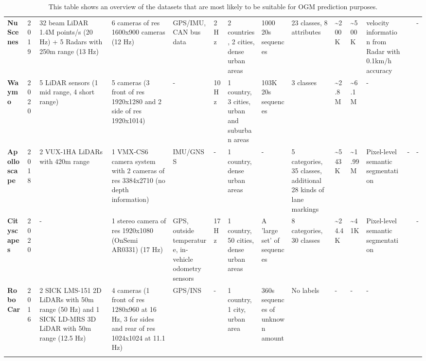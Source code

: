 {\begin{landscape}
\begin{longtable}{m{4em}m{2em}m{7em}m{7em}m{5em}m{2em}m{5em}m{7em}m{4em}m{2em}m{2em}m{5em}m{1em}m{1em}}
			\textbf{NuScenes \cite{caesar2020nuscenes}} & 2019 & 32 beam LiDAR 1.4M points/s (20 Hz) + 5 Radars with 250m range (13 Hz) & 6 cameras of res 1600x900 cameras (12 Hz) & GPS/IMU, CAN bus data & 2 Hz & 2 countries, 2 cities, dense urban areas & 1000 20s sequences & 23 classes, 8 attributes & \textasciitilde{}200K & \textasciitilde{}500K & velocity information from Radar with 0.1km/h accuracy & \cite{roddick2020predicting} \cite{loukkal2021driving} & - \\
			\textbf{Waymo \cite{sun2020scalability}} & 2020 & 5 LiDAR sensors (1 mid range, 4 short range) & 5 cameras (3 front of res 1920x1280 and 2 side of res 1920x1014) & - & 10 Hz & 1 country, 3 cities, urban and suburban areas & 103K 20s sequences & 3 classes & \textasciitilde{}2.8M & \textasciitilde{}6.1M & - & \cite{lange2020attention} \cite{toyungyernsub2020double} & \cite{lange2020attention} \cite{toyungyernsub2020double} \\
			\textbf{Apolloscape \cite{huang2019apolloscape}} & 2018 & 2 VUX-1HA LiDARs with 420m range & 1 VMX-CS6 camera system with 2 cameras of res 3384x2710 (no depth information) & IMU/GNSS & - & 1 country, dense urban areas & - & 5 categories, 35 classes, additional 28 kinds of lane markings & \textasciitilde{}543K & \textasciitilde{}1.99M & Pixel-level semantic segmentation & - & - \\
			\textbf{Cityscapes \cite{cordts2016cityscapes}} & 2020 & - & 1 stereo camera of res 1920x1080 (OnSemi AR0331) (17 Hz) & GPS, outside temperature, in-vehicle odometry sensors & 17 Hz & 1 country, 50 cities, dense urban areas & A 'large set' of sequences & 8 categories, 30 classes & \textasciitilde{}24.4K & \textasciitilde{}41K & Pixel-level semantic segmentation & \cite{hehn2021fast} & - \\
			\textbf{RoboCar \cite{robotcardatasetijrr}} & 2016 & 2 SICK LMS-151 2D LiDARs with 50m range (50 Hz) and 1 SICK LD-MRS 3D LiDAR with 50m range (12.5 Hz) & 4 cameras (1 front of res 1280x960 at 16 Hz, 3 for sides and rear of res 1024x1024 at 11.1 Hz) & GPS/INS & - & 1 country, 1 city, urban area & 360s sequences of unknown amount & No labels & - & - & - & \cite{dequaire2018deep} \cite{wang2020l2r} & \cite{dequaire2018deep} \\
			\bottomrule
		\caption{This table shows an overview of the datasets that are most likely to be suitable for \gls{OGM} prediction purposes.}
		\label{tab:datasets_overview}	
		\end{longtable}	
	\end{landscape}
}

